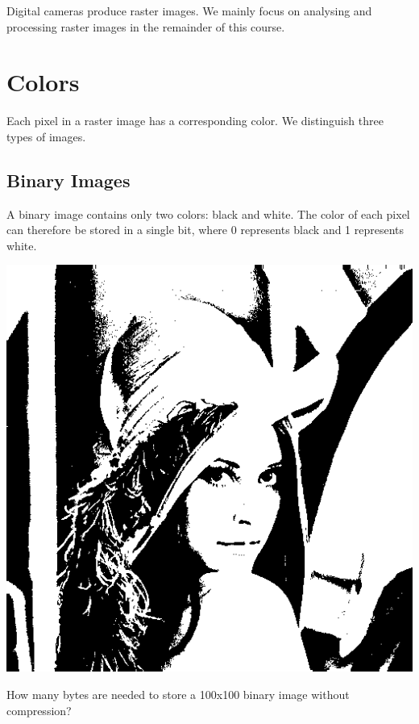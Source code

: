 \documentclass{book}
\begin{document}
Digital cameras produce raster images. We mainly focus on analysing and processing raster images in the remainder of this course.

\section{Colors}
Each pixel in a raster image has a corresponding color. We distinguish three types of images.

\subsection{Binary Images}
A binary image contains only two colors: black and white. The color of each pixel can therefore be stored in a single bit, where 0 represents black and 1 represents white.
\begin{center}
\includegraphics[scale=0.15]{lena-binary.png}
\end{center}
\begin{exercise}
How many bytes are needed to store a 100x100 binary image without compression?
\end{exercise}
\end{document}
